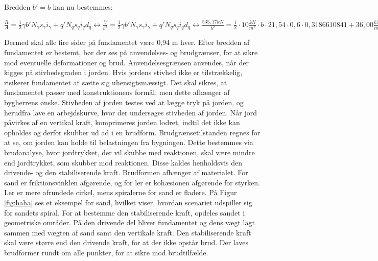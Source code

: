 Bredden $b'=b$ kan nu bestemmes: 
\begin{center}
	$\frac{R}{A} = \frac{1}{2} \gamma b' N_\gamma s_\gamma i_\gamma + q' N_q s_q i_q d_q \leftrightarrow \frac{V}{b^2} = \frac{1}{2} \gamma b' N_\gamma s_\gamma i_\gamma + q' N_q s_q i_q d_q \leftrightarrow \frac{535,\!17 kN}{b^2} = \frac{1}{2}\cdot 10 \frac{kN}{m^3}\cdot b\cdot 21,\!54\cdot 0,\!6 \cdot 0,\!3186610841 + 36,\!00 \frac{kN}{m^2}\cdot 24,\!08 \cdot 1,\!2 \cdot 0,\!56 \cdot 1) = 0,\!94 m$
\end{center}

Dermed skal alle fire sider på fundamentet være 0,94 m hver.
\newline
\newline
Efter bredden af fundamentet er bestemt, bør der ses på anvendelses- og brudgrænser, for at sikre mod eventuelle deformationer og brud. Anvendelsesgrænsen anvendes, når der kigges på stivhedsgraden i jorden. Hvis jordens stivhed ikke er tilstrækkelig, risikerer fundamentet at sætte sig uhensigtsmæssigt. Det skal sikres, at fundamentet passer med konstruktionens formål, men dette afhænger af bygherrens ønske. 
\newline \indent{     }  Stivheden af jorden testes ved at lægge tryk på jorden, og herudfra lave en arbejdskurve, hvor der undersøges stivheden af jorden.   
\newline \indent{     }  Når jord påvirkes af en vertikal kraft, komprimeres jorden lodret, indtil det ikke kan opholdes og derfor skubber ud ad i en brudform. Brudgrænsetilstanden regnes for at se, om jorden kan holde til belastningen fra bygningen. Dette bestemmes via brudanalyse, hvor jordtrykket, der vil skubbe med reaktionen, skal være mindre end jordtrykket, som skubber mod reaktionen. Disse kaldes henholdsvis den drivende- og den stabiliserende kraft. Brudformen afhænger af materialet. For sand er friktionsvinklen afgørende, og for ler er kohæsionen afgørende for styrken. Ler er mere afrundede cirkel, mens spiralerne for sand er fladere. 
\newline \indent{     }  På Figur \ref{fig:haha} ses et eksempel for sand, hvilket viser, hvordan scenariet udspiller sig for sandets spiral. For at bestemme den stabiliserende kraft, opdeles sandet i geometriske områder. På den drivende del bliver fundamentet og dens vægt lagt sammen med vægten af sand samt den vertikale kraft. Den stabiliserende kraft skal være større end den drivende kraft, for at der ikke opstår brud. Der laves brudformer rundt om alle punkter, for at sikre mod brudtilfælde. 

